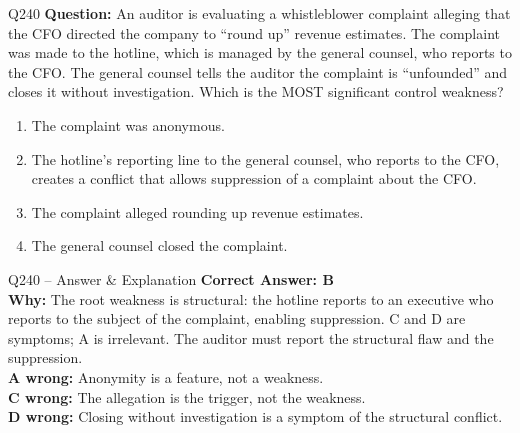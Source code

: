 \documentclass[aspectratio=169,10pt]{beamer}
\begin{document}
	\begin{frame}[t]{Q240}
		\small
		\textbf{Question:} An auditor is evaluating a whistleblower complaint alleging that the CFO directed the company to ``round up'' revenue estimates. The complaint was made to the hotline, which is managed by the general counsel, who reports to the CFO. The general counsel tells the auditor the complaint is ``unfounded'' and closes it without investigation. Which is the MOST significant control weakness?
		\begin{enumerate}[label=\Alph*.,itemsep=1pt,topsep=2pt]
			\item The complaint was anonymous.
			\item The hotline's reporting line to the general counsel, who reports to the CFO, creates a conflict that allows suppression of a complaint about the CFO.
			\item The complaint alleged rounding up revenue estimates.
			\item The general counsel closed the complaint.
		\end{enumerate}
	\end{frame}
	
	\begin{frame}[t]{Q240 -- Answer \& Explanation}
		\small
		\textbf{Correct Answer: B} \\[4pt]
		\textbf{Why:} The root weakness is structural: the hotline reports to an executive who reports to the subject of the complaint, enabling suppression. C and D are symptoms; A is irrelevant. The auditor must report the structural flaw and the suppression. \\[4pt]
		\textbf{A wrong:} Anonymity is a feature, not a weakness. \\[2pt]
		\textbf{C wrong:} The allegation is the trigger, not the weakness. \\[2pt]
		\textbf{D wrong:} Closing without investigation is a symptom of the structural conflict.
	\end{frame}
	
\end{document}
